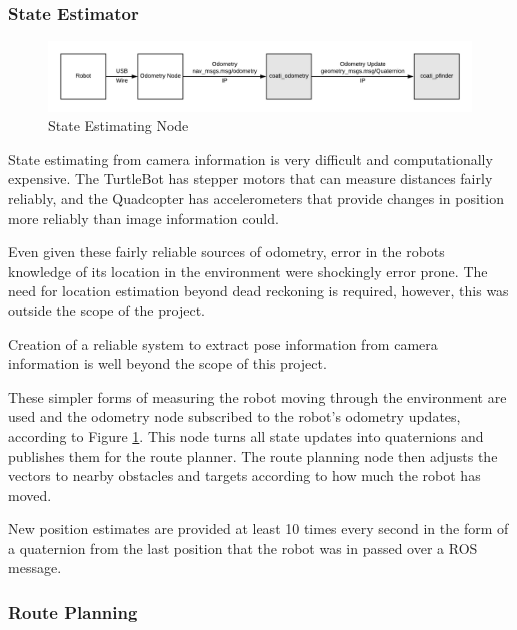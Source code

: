 \documentclass{article}[12]
\begin{document}
	\subsubsection{State Estimator}
	
	\begin{figure}[H]
		\centering
		\includegraphics[width=0.9\linewidth]{OdometryDigram.png}
		\caption{State Estimating Node}
		\label{fig:state}
	\end{figure}

	State estimating from camera information is very difficult and computationally expensive. The TurtleBot has stepper motors that can measure distances fairly reliably, and the Quadcopter has accelerometers that provide changes in position more reliably than image information could. 
	
	Even given these fairly reliable sources of odometry, error in the robots knowledge of its location in the environment were shockingly error prone. The need for location estimation beyond dead reckoning is required, however, this was outside the scope of the project.
	
	Creation of a reliable system to extract pose information from camera information is well beyond the scope of this project.
	
	These simpler forms of measuring the robot moving through the environment are used and the odometry node subscribed to the robot's odometry updates, according to Figure \ref{fig:state}. This node turns all state updates into quaternions and publishes them for the route planner. The route planning node then adjusts the vectors to nearby obstacles and targets according to how much the robot has moved. 
	
	New position estimates are provided at least 10 times every second in the form of a quaternion from the last position that the robot was in passed over a ROS message.
	

	\subsubsection{Route Planning}
	
\end{document}
